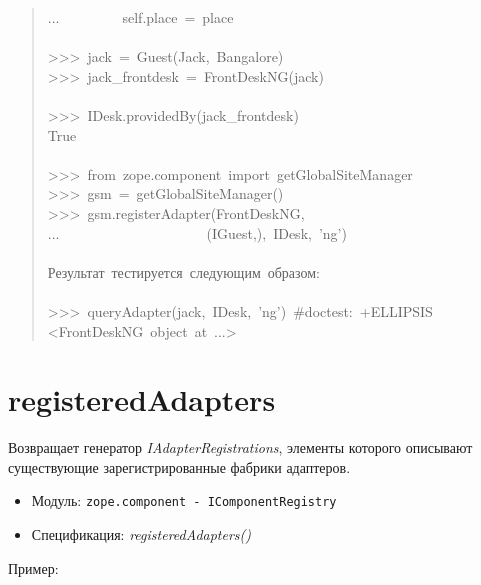 \documentclass[14pt,a4paper,openany,twoside,final]{extbook}
\providecommand*{\DUroletitlereference}[1]{\textsl{#1}}
\begin{document}
\begin{quote}
{...~~~~~~~~~self.place~=~place\\
~\\
>{}>{}>~jack~=~Guest(\textquotedbl{}Jack\textquotedbl{},~\textquotedbl{}Bangalore\textquotedbl{})\\
>{}>{}>~jack\_frontdesk~=~FrontDeskNG(jack)\\
~\\
>{}>{}>~IDesk.providedBy(jack\_frontdesk)\\
True\\
~\\
>{}>{}>~from~zope.component~import~getGlobalSiteManager\\
>{}>{}>~gsm~=~getGlobalSiteManager()\\
>{}>{}>~gsm.registerAdapter(FrontDeskNG,\\
...~~~~~~~~~~~~~~~~~~~~~(IGuest,),~IDesk,~'ng')\\
~\\
Результат~тестируется~следующим~образом:\\
~\\
>{}>{}>~queryAdapter(jack,~IDesk,~'ng')~\#doctest:~+ELLIPSIS\\
<FrontDeskNG~object~at~...>
}
\end{quote}


\section*{registeredAdapters%
  \label{registeredadapters}%
}

Возвращает генератор \DUroletitlereference{IAdapterRegistrations}, элементы которого
описывают существующие зарегистрированные фабрики адаптеров.

\begin{itemize}

\item Модуль: \texttt{zope.component - IComponentRegistry}

\item Спецификация: \DUroletitlereference{registeredAdapters()}

\end{itemize}

Пример:
\end{document}
